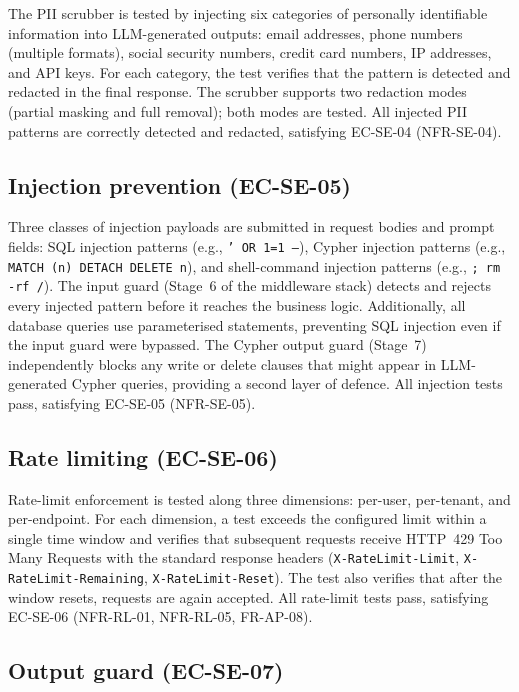 \documentclass[a4paper]{sapthesis}
\begin{document}
The PII scrubber is tested by injecting six categories of personally
identifiable information into LLM-generated outputs: email addresses,
phone numbers (multiple formats), social security numbers, credit card
numbers, IP addresses, and API keys.  For each category, the test
verifies that the pattern is detected and redacted in the final response.
The scrubber supports two redaction modes (partial masking and full
removal); both modes are tested.  All injected PII patterns are
correctly detected and redacted, satisfying EC-SE-04 (NFR-SE-04).

\subsection{Injection prevention (EC-SE-05)}

Three classes of injection payloads are submitted in request bodies and
prompt fields: SQL injection patterns (e.g., \texttt{' OR 1=1 --}),
Cypher injection patterns (e.g., \texttt{MATCH (n) DETACH DELETE n}),
and shell-command injection patterns (e.g., \texttt{; rm -rf /}).  The
input guard (Stage~6 of the middleware stack) detects and rejects every
injected pattern before it reaches the business logic.  Additionally, all
database queries use parameterised statements, preventing SQL injection
even if the input guard were bypassed.  The Cypher output guard
(Stage~7) independently blocks any write or delete clauses that might
appear in LLM-generated Cypher queries, providing a second layer of
defence.  All injection tests pass, satisfying EC-SE-05 (NFR-SE-05).

\subsection{Rate limiting (EC-SE-06)}

Rate-limit enforcement is tested along three dimensions: per-user,
per-tenant, and per-endpoint.  For each dimension, a test exceeds the
configured limit within a single time window and verifies that subsequent
requests receive HTTP~429 Too Many Requests with the standard response
headers (\texttt{X-RateLimit-Limit}, \texttt{X-RateLimit-Remaining},
\texttt{X-RateLimit-Reset}).  The test also verifies that after the
window resets, requests are again accepted.  All rate-limit tests pass,
satisfying EC-SE-06 (NFR-RL-01, NFR-RL-05, FR-AP-08).

\subsection{Output guard (EC-SE-07)}
\end{document}
